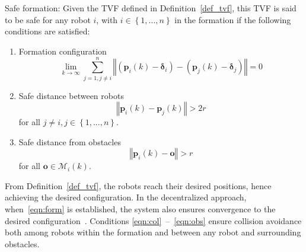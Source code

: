 \begin{definition}\label{def_pro}
Safe formation: Given the TVF defined in Definition~\ref{def_tvf}, this TVF is said to be safe for any robot $i$, with $i\in\left\{1,...,n\right\}$ in the formation if the following conditions are satisfied:
\begin{enumerate}
    \item Formation configuration
\begin{equation}
    \lim_{k\to\infty}\sum_{j=1,j\neq i}^n{\left\Vert\left(\mathbf{p}_i(k)-\mathbf{\delta}_i\right) - \left(\mathbf{p}_j(k)-\mathbf{\delta}_{j}\right)\right\Vert}=0
    \label{eqn:form}
\end{equation}
    \item Safe distance between robots
\begin{equation}
    \left\Vert \mathbf{p}_i(k)-\mathbf{p}_j(k)\right\Vert > 2r
    \label{eqn:col}
\end{equation}
for all $j\neq i, j\in\left\{1,...,n\right\}$.
    \item Safe distance from obstacles
\begin{equation}
    \left\Vert \mathbf{p}_i(k)-\mathbf{o}\right\Vert > r
    \label{eqn:obs}
\end{equation}
for all $\mathbf{o}\in\mathcal{M}_i(k)$. 
\end{enumerate}
\end{definition}

\begin{remark}
From Definition~\ref{def_tvf}, the robots reach their desired positions, hence achieving the desired configuration. In the decentralized approach, when~\eqref{eqn:form} is established, the system also ensures convergence to the desired configuration~\cite{Dong2015}.
Conditions \eqref{eqn:col}~--~\eqref{eqn:obs} ensure collision avoidance both among robots within the formation and between any robot and surrounding obstacles.
\end{remark}

